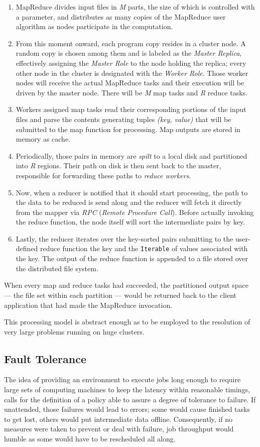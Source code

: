 \begin{enumerate}
 \item MapReduce divides input files in \emph{M} parts, the size of which is controlled with a parameter, and distributes as many copies of the MapReduce user algorithm as nodes participate in the computation.
 \item From this moment onward, each program copy resides in a cluster node. A random copy is chosen among them and is labeled as the \emph{Master Replica}, effectively assigning the \emph{Master Role} to the node holding the replica; every other node in the cluster is designated with the \emph{Worker Role}. Those worker nodes will receive the actual MapReduce tasks and their execution will be driven by the master node. There will be \emph{M} map tasks and \emph{R} reduce tasks.
 \item Workers assigned map tasks read their corresponding portions of the input files and parse the contents generating tuples \emph{(key, value)} that will be submitted to the map function for processing. Map outputs are stored in memory as cache.
 \item Periodically, those pairs in memory are \emph{spilt} to a local disk and partitioned into \emph{R} regions. Their path on disk is then sent back to the master, responsible for forwarding these paths to \emph{reduce workers}.
 \item Now, when a reducer is notified that it should start processing, the path to the data to be reduced is send along and the reducer will fetch it directly from the mapper via \emph{RPC} (\emph{Remote Procedure Call}). Before actually invoking the reduce function, the node itself will sort the intermediate pairs by key.
 \item Lastly, the reducer iterates over the key-sorted pairs submitting to the user-defined reduce function the key and the \texttt{Iterable} of values associated with the key. The output of the reduce function is appended to a file stored over the distributed file system.
\end{enumerate}

When every map and reduce tasks had succeeded, the partitioned output space --- the file set within each partition --- would be returned back to the client application that had made the MapReduce invocation.

This processing model is abstract enough as to be employed to the resolution of very large problems running on huge clusters.

\subsection{Fault Tolerance}\label{subsec:toleranciafallos}
\noindent The idea of providing an environment to execute jobs long enough to require large sets of computing machines to keep the latency within reasonable timings, calls for the definition of a policy able to assure a degree of tolerance to failure. If unattended, those failures would lead to errors; some would cause finished tasks to get lost, others would put intermediate data offline. Consequently, if no measures were taken to prevent or deal with failure, job throughput would humble as some would have to be rescheduled all along.

